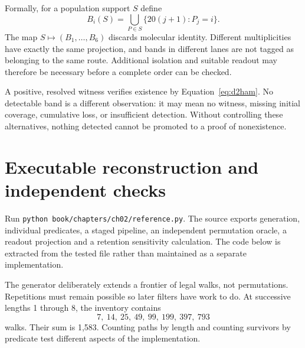 
Formally, for a population support $S$ define
\[
B_i(S)=\bigcup_{P\in S}\{20(j+1):P_j=i\}.
\]
The map $S\mapsto(B_1,\ldots,B_6)$ discards molecular identity. Different multiplicities have exactly the same projection, and bands in different lanes are not tagged as belonging to the same route. Additional isolation and suitable readout may therefore be necessary before a complete order can be checked.

A positive, resolved witness verifies existence by Equation~\ref{eq:d2ham}. No detectable band is a different observation: it may mean no witness, missing initial coverage, cumulative loss, or insufficient detection. Without controlling these alternatives, nothing detected cannot be promoted to a proof of nonexistence.

\Needspace{230pt}
\section{Executable reconstruction and independent checks}
Run \texttt{python book/chapters/ch02/reference.py}. The source exports generation, individual predicates, a staged pipeline, an independent permutation oracle, a readout projection and a retention sensitivity calculation. The code below is extracted from the tested file rather than maintained as a separate implementation.

\begin{minipage}{\linewidth}
\end{minipage}

The generator deliberately extends a frontier of legal walks, not permutations. Repetitions must remain possible so later filters have work to do. At successive lengths 1 through 8, the inventory contains
\[
7,\ 14,\ 25,\ 49,\ 99,\ 199,\ 397,\ 793
\]
walks. Their sum is 1,583. Counting paths by length and counting survivors by predicate test different aspects of the implementation.


